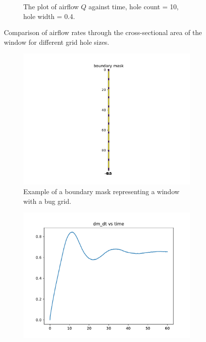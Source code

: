 \begin{figure}[H]
\begin{subfigure}[b]{0.47\textwidth}
        \caption{The plot of airflow $Q$ against time, hole count = 10, hole width = 0.4.}
        \label{fig: flowrate1}
    \end{subfigure}
    \caption{Comparison of airflow rates through the cross-sectional area of the window for different grid hole sizes.}
    \label{fig: bound_plos_flowrate1}
\end{figure}

\begin{figure}[H]
    \centering
    \begin{subfigure}[b]{0.47\textwidth}
        \centering
        \includegraphics[width=\textwidth]{figures/bound_ex2.pdf}
        \caption{Example of a boundary mask representing a window with a bug grid.}
        \label{fig: bound2}
    \end{subfigure}
    \hfill
    \begin{subfigure}[b]{0.47\textwidth}
        \centering
        \includegraphics[width=\textwidth]{figures/dm_dt/log_holecount_12_holewidth_0.1_repeat_1.pdf}  %

\end{subfigure}
\end{figure}
